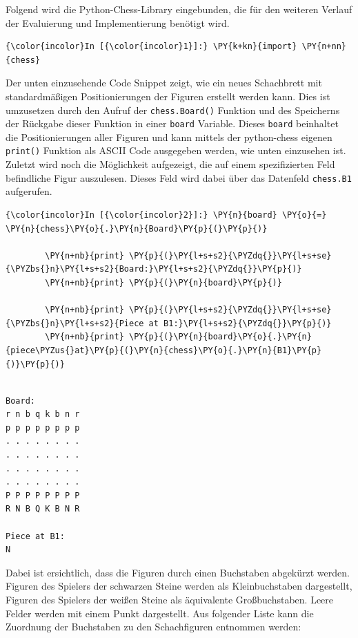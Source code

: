 Folgend wird die Python-Chess-Library eingebunden, die für den
weiteren Verlauf der Evaluierung und Implementierung benötigt wird.

    \begin{Verbatim}[commandchars=\\\{\}]
{\color{incolor}In [{\color{incolor}1}]:} \PY{k+kn}{import} \PY{n+nn}{chess}
\end{Verbatim}


    Der unten einzusehende Code Snippet zeigt, wie ein neues Schachbrett mit
standardmäßigen Positionierungen der Figuren erstellt werden kann. Dies
ist umzusetzen durch den Aufruf der \texttt{chess.Board()} Funktion und
des Speicherns der Rückgabe dieser Funktion in einer \texttt{board}
Variable. Dieses \texttt{board} beinhaltet die Positionierungen aller
Figuren und kann mittels der python-chess eigenen \texttt{print()} Funktion
als ASCII Code ausgegeben werden, wie unten einzusehen ist. Zuletzt wird
noch die Möglichkeit aufgezeigt, die auf einem spezifizierten Feld
befindliche Figur auszulesen. Dieses Feld wird dabei über das Datenfeld
\texttt{chess.B1} aufgerufen.

    \begin{Verbatim}[commandchars=\\\{\}]
{\color{incolor}In [{\color{incolor}2}]:} \PY{n}{board} \PY{o}{=} \PY{n}{chess}\PY{o}{.}\PY{n}{Board}\PY{p}{(}\PY{p}{)}
            
        \PY{n+nb}{print} \PY{p}{(}\PY{l+s+s2}{\PYZdq{}}\PY{l+s+se}{\PYZbs{}n}\PY{l+s+s2}{Board:}\PY{l+s+s2}{\PYZdq{}}\PY{p}{)}
        \PY{n+nb}{print} \PY{p}{(}\PY{n}{board}\PY{p}{)}
        
        \PY{n+nb}{print} \PY{p}{(}\PY{l+s+s2}{\PYZdq{}}\PY{l+s+se}{\PYZbs{}n}\PY{l+s+s2}{Piece at B1:}\PY{l+s+s2}{\PYZdq{}}\PY{p}{)}
        \PY{n+nb}{print} \PY{p}{(}\PY{n}{board}\PY{o}{.}\PY{n}{piece\PYZus{}at}\PY{p}{(}\PY{n}{chess}\PY{o}{.}\PY{n}{B1}\PY{p}{)}\PY{p}{)}
\end{Verbatim}


    \begin{Verbatim}[commandchars=\\\{\}]

Board:
r n b q k b n r
p p p p p p p p
. . . . . . . .
. . . . . . . .
. . . . . . . .
. . . . . . . .
P P P P P P P P
R N B Q K B N R

Piece at B1:
N

    \end{Verbatim}

    Dabei ist ersichtlich, dass die Figuren durch einen Buchstaben abgekürzt
werden. Figuren des Spielers der schwarzen Steine werden als Kleinbuchstaben
dargestellt, Figuren des Spielers der weißen Steine als äquivalente
Großbuchstaben. Leere Felder werden mit einem Punkt dargestellt. Aus
folgender Liste kann die Zuordnung der Buchstaben zu den Schachfiguren
entnommen werden:

